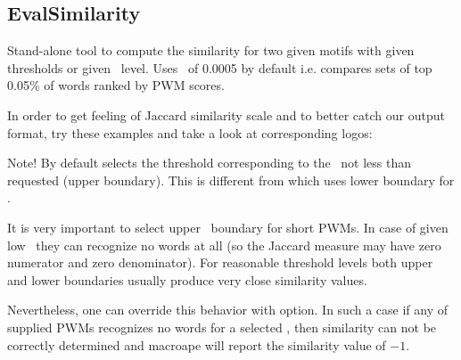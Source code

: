 \subsection{EvalSimilarity}
Stand-alone tool to compute the similarity for two given motifs with given thresholds or given \pvalue\ level. Uses \pvalue\ of 0.0005 by default i.e. compares sets of top 0.05\% of words ranked by PWM scores. 

In order to get feeling of Jaccard similarity scale and to better catch our output format, try these examples and take a look at corresponding logos:




Note! By default  selects the threshold corresponding to the \pvalue\ not 
less than requested (upper boundary). This is different from  which uses 
lower boundary for \pvalue. 

It is very important to select upper \pvalue\ boundary for short PWMs. In case of given 
low \pvalues\ they can recognize no words at all (so the Jaccard measure may have zero 
numerator and zero denominator). For reasonable threshold levels both upper and lower 
boundaries usually produce very close similarity values. 

Nevertheless, one can override this behavior with  option. In such a case if 
any of supplied PWMs recognizes no words for a selected \pvalue, then similarity can not be 
correctly determined and macroape will report the similarity value of $-1$. 



